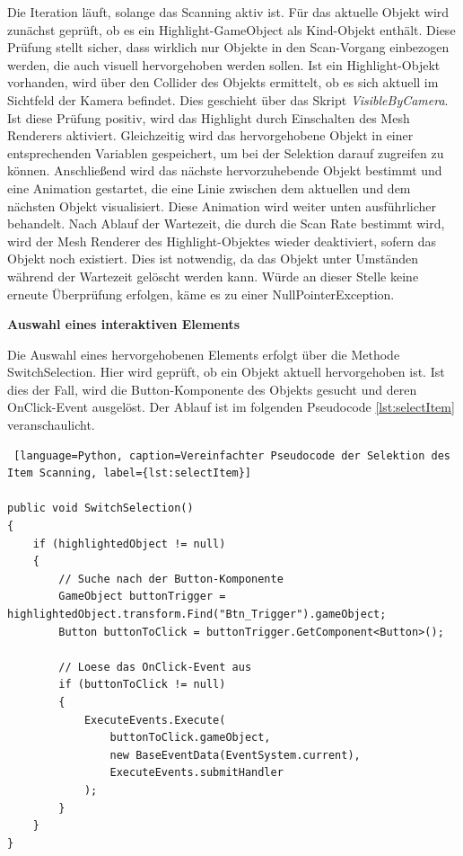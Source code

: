 Die Iteration läuft, solange das Scanning aktiv ist. Für das aktuelle Objekt wird zunächst geprüft, ob es ein Highlight-GameObject als Kind-Objekt enthält. Diese Prüfung stellt sicher, dass wirklich nur Objekte in den Scan-Vorgang einbezogen werden, die auch visuell hervorgehoben werden sollen. Ist ein Highlight-Objekt vorhanden, wird über den Collider des Objekts ermittelt, ob es sich aktuell im Sichtfeld der Kamera befindet. Dies geschieht über das Skript \textit{VisibleByCamera}.
Ist diese Prüfung positiv, wird das Highlight durch Einschalten des Mesh Renderers aktiviert. Gleichzeitig wird das hervorgehobene Objekt in einer entsprechenden Variablen gespeichert, um bei der Selektion darauf zugreifen zu können. Anschließend wird das nächste hervorzuhebende Objekt bestimmt und eine Animation gestartet, die eine Linie zwischen dem aktuellen und dem nächsten Objekt visualisiert. Diese Animation wird weiter unten ausführlicher behandelt. Nach Ablauf der Wartezeit, die durch die Scan Rate bestimmt wird, wird der Mesh Renderer des Highlight-Objektes wieder deaktiviert, sofern das Objekt noch existiert. Dies ist notwendig, da das Objekt unter Umständen während der Wartezeit gelöscht werden kann. Würde an dieser Stelle keine erneute Überprüfung erfolgen, käme es zu einer NullPointerException.


\textbf{Auswahl eines interaktiven Elements}

Die Auswahl eines hervorgehobenen Elements erfolgt über die Methode SwitchSelection. Hier wird geprüft, ob ein Objekt aktuell hervorgehoben ist. Ist dies der Fall, wird die Button-Komponente des Objekts gesucht und deren OnClick-Event ausgelöst. Der Ablauf ist im folgenden Pseudocode \autoref{lst:selectItem} veranschaulicht.

\begin{lstlisting} [language=Python, caption=Vereinfachter Pseudocode der Selektion des Item Scanning, label={lst:selectItem}]

public void SwitchSelection()
{
    if (highlightedObject != null)
    {
        // Suche nach der Button-Komponente
        GameObject buttonTrigger = highlightedObject.transform.Find("Btn_Trigger").gameObject;
        Button buttonToClick = buttonTrigger.GetComponent<Button>();

        // Loese das OnClick-Event aus
        if (buttonToClick != null)
        {
            ExecuteEvents.Execute(
                buttonToClick.gameObject,
                new BaseEventData(EventSystem.current),
                ExecuteEvents.submitHandler
            );
        }
    }
}
    
\end{lstlisting}

